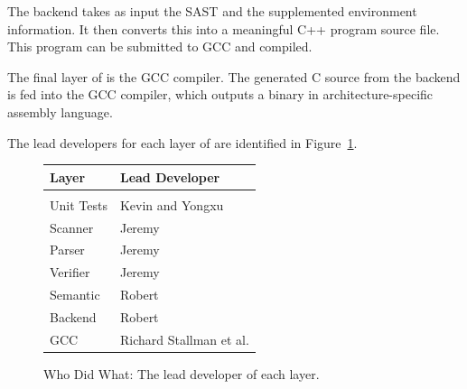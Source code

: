 
The backend takes as input the SAST and the supplemented environment
information. It then converts this into a meaningful C++ program source
file. This program can be submitted to GCC and compiled.

The final layer of \sys{} is the GCC compiler. The generated C source from
the backend is fed into the GCC compiler, which outputs a binary in
architecture-specific assembly language.

The lead developers for each layer of \sys{} are identified in
Figure~\ref{fig:leads}.


\begin{figure}
\begin{center}
\begin{tabular}{l | l}
{\bf Layer} & {\bf Lead Developer} \\
\hline \\
Unit Tests & Kevin and Yongxu \\
Scanner & Jeremy \\
Parser & Jeremy \\
Verifier & Jeremy \\
Semantic & Robert \\
Backend & Robert \\
GCC & Richard Stallman et al. \\
\end{tabular}
\caption{Who Did What: The lead developer of each layer.}
\end{center}
\label{fig:leads}
\end{figure}


